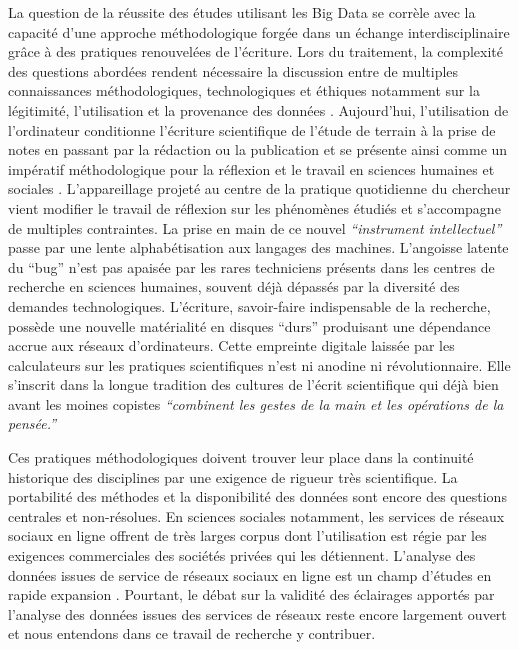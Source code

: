 La question de la réussite des études utilisant les Big Data se corrèle avec la capacité d{\textquoteright}une approche méthodologique forgée dans un échange interdisciplinaire grâce à des pratiques renouvelées de l{\textquoteright}écriture. Lors du traitement, la complexité des questions abordées rendent nécessaire la discussion entre de multiples connaissances méthodologiques, technologiques et éthiques notamment sur la légitimité, l'utilisation et la provenance des données \citep{Boyd2011}. Aujourd{\textquoteright}hui, l{\textquoteright}utilisation de l{\textquoteright}ordinateur conditionne l{\textquoteright}écriture scientifique de l{\textquoteright}étude de terrain à la prise de notes en passant par la rédaction ou la publication et se présente ainsi comme un impératif méthodologique pour la réflexion et le travail en sciences humaines et sociales \citep{Wieviorka2013}. L{\textquoteright}appareillage projeté au centre de la pratique quotidienne du chercheur vient modifier le travail de réflexion sur les phénomènes étudiés et s{\textquoteright}accompagne de multiples contraintes. La prise en main de ce nouvel \textit{{\textquotedblleft}instrument intellectuel{\textquotedblright} }\citep{Guichard2014} passe par une lente alphabétisation aux langages des machines. L{\textquoteright}angoisse latente du {\textquotedblleft}bug{\textquotedblright} n{\textquoteright}est pas apaisée par les rares techniciens présents dans les centres de recherche en sciences humaines, souvent déjà dépassés par la diversité des demandes technologiques. L{\textquoteright}écriture, savoir-faire indispensable de la recherche, possède une nouvelle matérialité en disques ``durs'' produisant une dépendance accrue aux réseaux d{\textquoteright}ordinateurs. Cette empreinte digitale laissée par les calculateurs sur les pratiques scientifiques n{\textquoteright}est ni anodine ni révolutionnaire. Elle s{\textquoteright}inscrit dans la longue tradition des cultures de l{\textquoteright}écrit scientifique qui déjà bien avant les moines copistes \textit{{\textquotedblleft}combinent les gestes de la main et les opérations de la pensée.{\textquotedblright}} \citep{Jacob2011}  

Ces pratiques méthodologiques doivent trouver leur place dans la continuité historique des disciplines par une exigence de rigueur très scientifique. La portabilité des méthodes et la disponibilité des données sont encore des questions centrales et non-résolues. En sciences sociales notamment, les services de réseaux sociaux en ligne offrent de très larges corpus dont l{\textquoteright}utilisation est régie par les exigences commerciales des sociétés privées qui les détiennent. L{\textquoteright}analyse des données issues de service de réseaux sociaux en ligne est un champ d{\textquoteright}études en rapide expansion \citep{Nettleton2013}. Pourtant, le débat sur la validité des éclairages apportés par l{\textquoteright}analyse des données issues des services de réseaux reste encore largement ouvert et nous entendons dans ce travail de recherche y contribuer.

